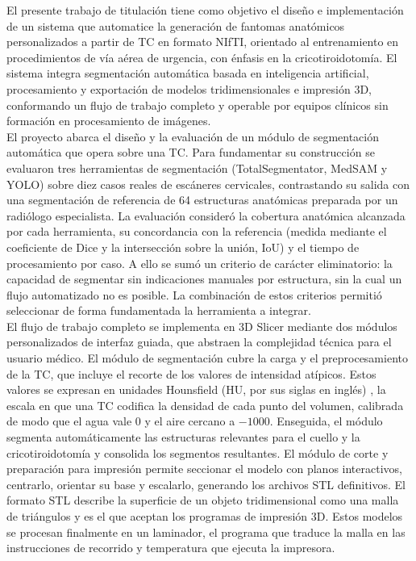 El presente trabajo de titulación tiene como objetivo el diseño e implementación de un sistema que automatice la generación de fantomas anatómicos personalizados a partir de TC en formato NIfTI, orientado al entrenamiento en procedimientos de vía aérea de urgencia, con énfasis en la cricotiroidotomía. El sistema integra segmentación automática basada en inteligencia artificial, procesamiento y exportación de modelos tridimensionales e impresión 3D, conformando un flujo de trabajo completo y operable por equipos clínicos sin formación en procesamiento de imágenes.\\

El proyecto abarca el diseño y la evaluación de un módulo de segmentación automática que opera sobre una TC. Para fundamentar su construcción se evaluaron tres herramientas de segmentación (TotalSegmentator, MedSAM y YOLO) sobre diez casos reales de escáneres cervicales, contrastando su salida con una segmentación de referencia de 64 estructuras anatómicas preparada por un radiólogo especialista. La evaluación consideró la cobertura anatómica alcanzada por cada herramienta, su concordancia con la referencia (medida mediante el coeficiente de Dice y la intersección sobre la unión, IoU) y el tiempo de procesamiento por caso. A ello se sumó un criterio de carácter eliminatorio: la capacidad de segmentar sin indicaciones manuales por estructura, sin la cual un flujo automatizado no es posible. La combinación de estos criterios permitió seleccionar de forma fundamentada la herramienta a integrar.\\

El flujo de trabajo completo se implementa en 3D Slicer mediante dos módulos personalizados de interfaz guiada, que abstraen la complejidad técnica para el usuario médico. El módulo de segmentación cubre la carga y el preprocesamiento de la TC, que incluye el recorte de los valores de intensidad atípicos. Estos valores se expresan en unidades Hounsfield (HU, por sus siglas en inglés) \citep{hounsfield1973}, la escala en que una TC codifica la densidad de cada punto del volumen, calibrada de modo que el agua vale $0$ y el aire cercano a $-1000$. Enseguida, el módulo segmenta automáticamente las estructuras relevantes para el cuello y la cricotiroidotomía y consolida los segmentos resultantes. El módulo de corte y preparación para impresión permite seccionar el modelo con planos interactivos, centrarlo, orientar su base y escalarlo, generando los archivos STL definitivos. El formato STL describe la superficie de un objeto tridimensional como una malla de triángulos y es el que aceptan los programas de impresión 3D. Estos modelos se procesan finalmente en un laminador, el programa que traduce la malla en las instrucciones de recorrido y temperatura que ejecuta la impresora.\\

